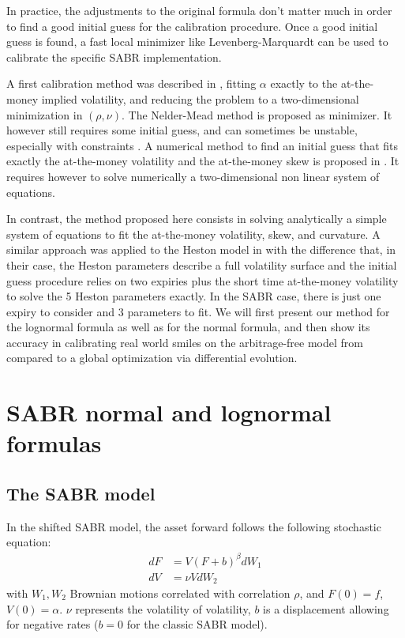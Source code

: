 \documentclass[]{rAMF2e}
\begin{document}
In practice, the adjustments to the original formula don't matter much in order to find a good initial guess for the calibration procedure. Once a good initial guess is found, a fast local minimizer like Levenberg-Marquardt can be used to calibrate the specific SABR implementation. 

A first calibration method was described in \citep{west2005calibration}, fitting $\alpha$ exactly to the at-the-money implied volatility, and reducing the problem to a two-dimensional minimization in $(\rho,\nu)$. The Nelder-Mead method is proposed as minimizer. It however still requires some initial guess, and can sometimes be unstable, especially with constraints \citep{lefloch2014nelder}. A numerical method to find an initial guess that fits exactly the at-the-money volatility and the at-the-money skew is proposed in \citep{gauthier2009fitting}. It requires however to solve numerically a two-dimensional non linear system of equations.

In contrast, the method proposed here consists in solving analytically a simple system of equations to fit the at-the-money volatility, skew, and curvature. A similar approach was applied to the Heston model in \citep{forde2012small} with the difference that, in their case, the Heston parameters describe a full volatility surface and the initial guess procedure relies on two expiries plus the short time at-the-money volatility to solve the 5 Heston parameters exactly. In the SABR case, there is just one expiry to consider and 3 parameters to fit. We will first present our method for the lognormal formula as well as for the normal formula, and then show its accuracy in calibrating real world smiles on the arbitrage-free model from \citet{hagan2013arbitrage} compared to a global optimization via differential evolution.


\section{SABR normal and lognormal formulas}

\subsection{The SABR model}
In the shifted SABR model, the asset forward follows the following stochastic equation:
\begin{align}
dF &= V (F+b)^\beta dW_1\\
dV &= \nu V dW_2
\end{align}
with $W_1, W_2$ Brownian motions correlated with correlation $\rho$,
and $F(0) = f$, $V(0) = \alpha$.
$\nu$ represents the volatility of volatility, $b$ is a displacement allowing for negative rates ($b=0$ for the classic SABR model).
\end{document}
